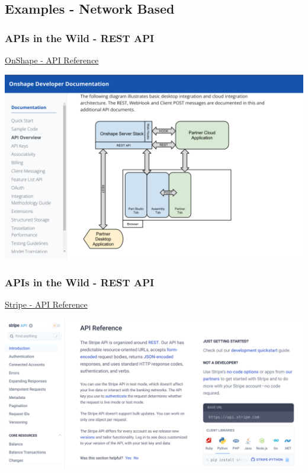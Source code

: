 \documentclass[t]{beamer}
\begin{document}
\subsection{Examples - Network Based}


\begin{frame}
  \frametitle{APIs in the Wild - REST API}
  \vspace{-10pt}

  \href{https://onshape-public.github.io/docs/apioverview/}{OnShape - API Reference}

  \centering
  \includegraphics[height=.75\textheight]{./figures/onshape_api.png}

\end{frame}

\begin{frame}
  \frametitle{APIs in the Wild - REST API}
  \vspace{-10pt}

  \href{https://stripe.com/docs/api}{Stripe - API Reference}

  \centering
  \includegraphics[height=.75\textheight]{./figures/stripe_api.png}

\end{frame}
\end{document}
